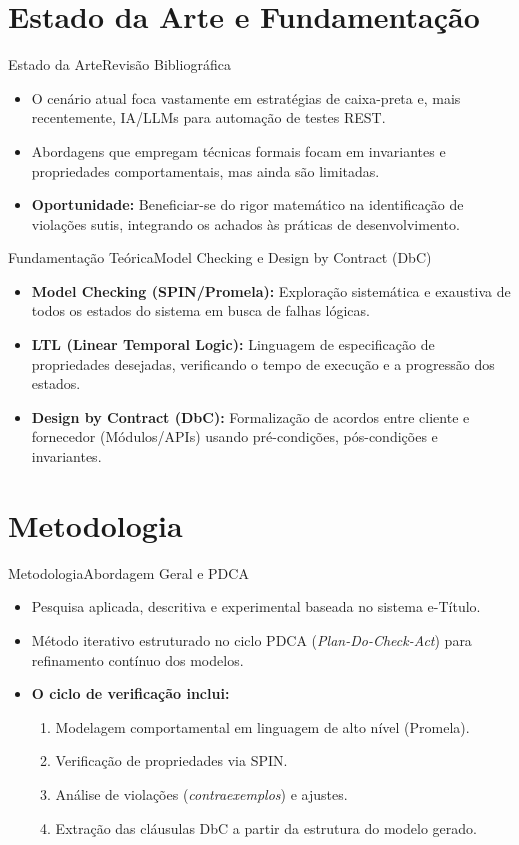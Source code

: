 \documentclass[10pt]{beamer}
\begin{document}
\section{Estado da Arte e Fundamentação}
\begin{frame}{Estado da Arte}{Revisão Bibliográfica}
  \begin{itemize}
    \item O cenário atual foca vastamente em estratégias de caixa-preta e, mais recentemente, IA/LLMs para automação de testes REST.
    \item Abordagens que empregam técnicas formais focam em invariantes e propriedades comportamentais, mas ainda são limitadas.
    \item \textbf{Oportunidade:} Beneficiar-se do rigor matemático na identificação de violações sutis, integrando os achados às práticas de desenvolvimento.
  \end{itemize}
\end{frame}

\begin{frame}{Fundamentação Teórica}{Model Checking e Design by Contract (DbC)}
  \begin{itemize}
    \item \textbf{Model Checking (SPIN/Promela):} Exploração sistemática e exaustiva de todos os estados do sistema em busca de falhas lógicas.
    \item \textbf{LTL (Linear Temporal Logic):} Linguagem de especificação de propriedades desejadas, verificando o tempo de execução e a progressão dos estados.
    \item \textbf{Design by Contract (DbC):} Formalização de acordos entre cliente e fornecedor (Módulos/APIs) usando pré-condições, pós-condições e invariantes.
  \end{itemize}
\end{frame}

\section{Metodologia}
\begin{frame}{Metodologia}{Abordagem Geral e PDCA}
  \begin{itemize}
    \item Pesquisa aplicada, descritiva e experimental baseada no sistema e-Título.
    \item Método iterativo estruturado no ciclo PDCA (\textit{Plan-Do-Check-Act}) para refinamento contínuo dos modelos.
    \item \textbf{O ciclo de verificação inclui:}
    \begin{enumerate}
        \item Modelagem comportamental em linguagem de alto nível (Promela).
        \item Verificação de propriedades via SPIN.
        \item Análise de violações (\textit{contraexemplos}) e ajustes.
        \item Extração das cláusulas DbC a partir da estrutura do modelo gerado.
    \end{enumerate}
  \end{itemize}
\end{frame}
\end{document}
